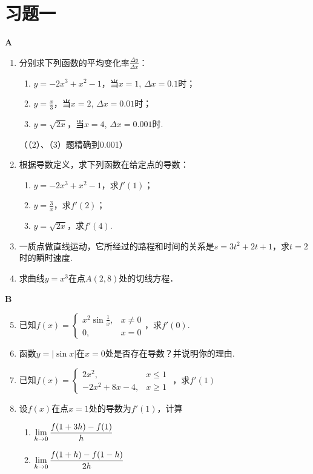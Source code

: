 \section*{习题一}
\begin{center}
    \bfseries A
\end{center}

\begin{enumerate}
    \item 分别求下列函数的平均变化率$\frac{\Delta y}{\Delta x}$：
\begin{enumerate}[(1)]
    \item $y=-2x^3+x^2-1$，当$x=1$, $\Delta x=0.1$时；
    \item $y=\frac{x}{3}$，当$x=2$, $\Delta x=0.01$时；
    \item $y=\sqrt{2x}$，当$x=4$, $\Delta x=0.001$时.
\end{enumerate}
    （（2）、（3）题精确到0.001）
    \item     根据导数定义，求下列函数在给定点的导数：
\begin{multicols}{2}
\begin{enumerate}[(1)]
    \item $y=-2x^3+x^2-1$，求$f'(1)$；
    \item $y=\frac{3}{x}$，求$f'(2)$；
    \item $y=\sqrt{2x}$，求$f'(4)$.
\end{enumerate}
\end{multicols}
    \item    一质点做直线运动，它所经过的路程和时间的关系是$s=3t^2+2t+1$，求$t=2$时的瞬时速度.
    \item    求曲线$y=x^3$在点$A(2,8)$处的切线方程．
\end{enumerate}

\begin{center}
    \bfseries B
\end{center}

\begin{enumerate}\setcounter{enumi}{4}
    \item 已知$f(x)=\begin{cases}
        x^2\sin\frac{1}{x},& x\ne 0\\
        0,& x=0
    \end{cases}$，求$f'(0)$.
\item 函数$y=|\sin x|$在$x=0$处是否存在导数？并说明你的理由.
\item 已知$f(x)=\begin{cases}
    2x^2,& x\le 1\\
-2x^2+8x-4,& x\ge 1
\end{cases}$
，求$f'(1)$
\item 设$f(x)$在点$x=1$处的导数为$f'(1)$，计算
\begin{multicols}{2}
\begin{enumerate}[(1)]
    \item $\lim\limits_{h\to 0}\dfrac{f(1+3h)-f(1)}{h}$
    \item $\lim\limits_{h\to 0}\dfrac{f(1+h)-f(1-h)}{2h}$
\end{enumerate}
\end{multicols}
\end{enumerate}

